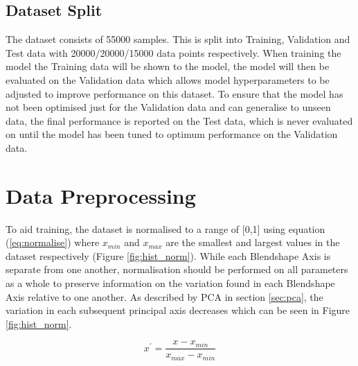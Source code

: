 \subsection{Dataset Split}
The dataset consists of 55000 samples.
This is split into Training, Validation and Test data with 20000/20000/15000 data points respectively.
When training the model the Training data will be shown to the model, the model will then be evaluated on the Validation data which allows model hyperparameters to be adjusted to improve performance on this dataset.
To ensure that the model has not been optimised just for the Validation data and can generalise to unseen data, the final performance is reported on the Test data, which is never evaluated on until the model has been tuned to optimum performance on the Validation data.

\section{Data Preprocessing}
To aid training, the dataset is normalised to a range of [0,1] using equation (\ref{eq:normalise}) where $x_{min}$ and $x_{max}$ are the smallest and largest values in the dataset respectively (Figure \ref{fig:hist_norm}).
While each Blendshape Axis is separate from one another, normalisation should be performed on all parameters as a whole to preserve information on the variation found in each Blendshape Axis relative to one another.
As described by PCA in section \ref{sec:pca}, the variation in each subsequent principal axis decreases which can be seen in Figure \ref{fig:hist_norm}.

\begin{equation} \label{eq:normalise}
   x^\prime = \frac{x - x_{min}}{x_{max} - x_{min}} 
\end{equation}

